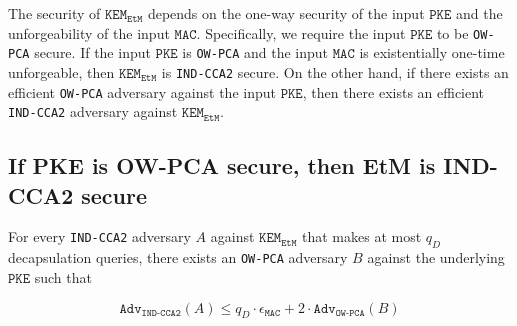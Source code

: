 \documentclass[floatrow,journal=tches,submission]{iacrtrans}
\newcommand{\monospace}{\texttt}
\newcommand{\pke}{\monospace{PKE}}
\newcommand{\kem}{\monospace{KEM}}
\newcommand{\etm}{\monospace{EtM}}  %
\newcommand{\mac}{\monospace{MAC}}
\begin{document}
The security of $\kem_\etm$ depends on the one-way security of the input $\pke$ and the unforgeability of the input $\mac$. Specifically, we require the input $\pke$ to be \monospace{OW-PCA} secure. If the input $\pke$ is \monospace{OW-PCA} and the input $\mac$ is existentially one-time unforgeable, then $\kem_\etm$ is \monospace{IND-CCA2} secure. On the other hand, if there exists an efficient \monospace{OW-PCA} adversary against the input $\pke$, then there exists an efficient \monospace{IND-CCA2} adversary against $\kem_\etm$.

\subsection{If PKE is OW-PCA secure, then EtM is IND-CCA2 secure}

\begin{theorem}\label{thm:ow-pca-implies-kem-ind-cca2}
    For every \monospace{IND-CCA2} adversary $A$ against $\kem_\etm$ that makes at most $q_D$ decapsulation queries, there exists an \monospace{OW-PCA} adversary $B$ against the underlying $\pke$ such that

    \begin{equation*}
        \monospace{Adv}_\monospace{IND-CCA2}(A) \leq q_D \cdot \epsilon_\mac + 2 \cdot \monospace{Adv}_\monospace{OW-PCA}(B)
    \end{equation*}
\end{theorem}
\end{document}
